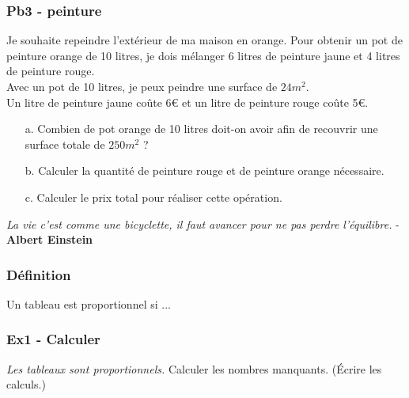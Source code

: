 \subsubsection*{Pb3 - peinture} 

Je souhaite repeindre l'extérieur de ma maison en orange. Pour obtenir un pot de peinture orange de 10 litres, je dois mélanger 6 litres de peinture jaune et 4 litres de peinture rouge.\\ 

Avec un pot de 10 litres, je peux peindre une surface de $24m^2$. \\

Un litre de peinture jaune coûte 6€ et un litre de peinture rouge coûte 5€. 

\begin{enumerate}
  \item[a.] Combien de pot orange de 10 litres doit-on avoir afin de recouvrir une surface totale de $250m^2$ ?
  \item[b.] Calculer la quantité de peinture rouge et de peinture orange nécessaire.
  \item[c.] Calculer le prix total pour réaliser cette opération.  
\end{enumerate}

\newpage


\begin{center}
  \textit{La vie c’est comme une bicyclette, il faut avancer pour ne pas perdre l’équilibre.} - \textbf{Albert Einstein}
\end{center}


\subsubsection*{Définition}

Un tableau est proportionnel si ...

\subsubsection*{Ex1 - Calculer} 

\textit{Les tableaux sont proportionnels.} Calculer les nombres manquants. (Écrire les calculs.) 

